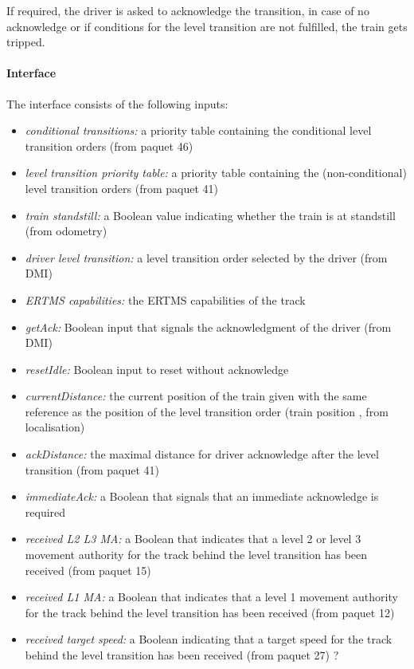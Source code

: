 If required, the driver is asked to acknowledge the transition, in case of no acknowledge or if conditions for the level transition are not fulfilled, the train gets tripped.

\paragraph{Interface}
The interface consists of the following inputs:

\begin{itemize}
\item \emph{conditional transitions:} a priority table containing the
  conditional level transition orders (from paquet 46)
\item \emph{level transition priority table:} a priority table containing the
  (non-conditional) level transition orders (from paquet 41)
\item \emph{train standstill:} a Boolean value indicating whether the train is
  at standstill (from odometry)
\item \emph{driver level transition:} a level transition order selected by the
  driver (from DMI)
\item \emph{ERTMS capabilities:} the ERTMS capabilities of the track
\item \emph{getAck:} Boolean input that signals the acknowledgment of the
  driver (from DMI)
\item \emph{resetIdle:} Boolean input to reset without acknowledge
\item \emph{currentDistance:} the current position of the train given with the
  same reference as the position of the level transition order (train position , from localisation)
\item \emph{ackDistance:} the maximal distance for driver acknowledge after
  the level transition (from paquet 41)
\item \emph{immediateAck:} a Boolean that signals that an immediate acknowledge
  is required
\item \emph{received L2 L3 MA:} a Boolean that indicates that a level 2 or level
  3 movement authority for the track behind the level transition has been
  received (from paquet 15)
\item \emph{received L1 MA:} a Boolean that indicates that a level 1 movement
  authority for the track behind the level transition has been received (from paquet 12)
\item \emph{received target speed:} a Boolean indicating that a target speed for
  the track behind the level transition has been received (from paquet 27) ?
\end{itemize}

